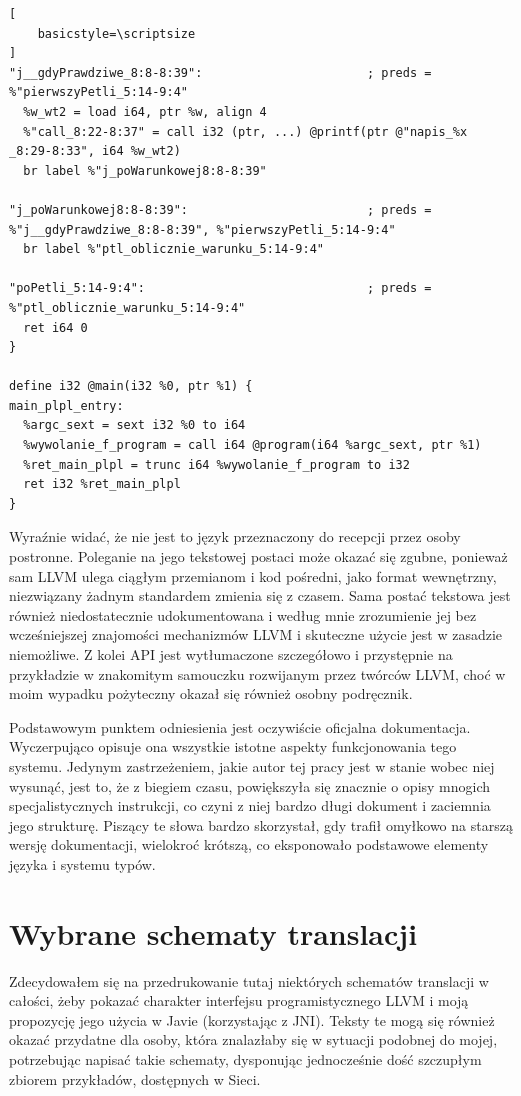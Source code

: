 \begin{lstlisting}[
    basicstyle=\scriptsize
]
"j__gdyPrawdziwe_8:8-8:39":                       ; preds = %"pierwszyPetli_5:14-9:4"
  %w_wt2 = load i64, ptr %w, align 4
  %"call_8:22-8:37" = call i32 (ptr, ...) @printf(ptr @"napis_%x _8:29-8:33", i64 %w_wt2)
  br label %"j_poWarunkowej8:8-8:39"

"j_poWarunkowej8:8-8:39":                         ; preds = %"j__gdyPrawdziwe_8:8-8:39", %"pierwszyPetli_5:14-9:4"
  br label %"ptl_oblicznie_warunku_5:14-9:4"

"poPetli_5:14-9:4":                               ; preds = %"ptl_oblicznie_warunku_5:14-9:4"
  ret i64 0
}

define i32 @main(i32 %0, ptr %1) {
main_plpl_entry:
  %argc_sext = sext i32 %0 to i64
  %wywolanie_f_program = call i64 @program(i64 %argc_sext, ptr %1)
  %ret_main_plpl = trunc i64 %wywolanie_f_program to i32
  ret i32 %ret_main_plpl
}

\end{lstlisting}

Wyraźnie widać, że nie jest to język przeznaczony do recepcji przez osoby postronne. Poleganie na jego tekstowej postaci może okazać się zgubne, ponieważ sam LLVM ulega ciągłym przemianom i kod pośredni, jako format wewnętrzny, niezwiązany żadnym standardem zmienia się z czasem. Sama postać tekstowa jest również niedostatecznie udokumentowana i według mnie zrozumienie jej bez wcześniejszej znajomości mechanizmów LLVM i skuteczne użycie jest w zasadzie niemożliwe. Z kolei API jest wytłumaczone szczegółowo i przystępnie na przykładzie w znakomitym samouczku rozwijanym przez twórców LLVM\cite{kalleidoscope}, choć w moim wypadku pożyteczny okazał się również osobny podręcznik.\cite{llvm_nacke_textbook}

Podstawowym punktem odniesienia  jest oczywiście oficjalna dokumentacja\cite{llvm_lang_ref}. Wyczerpująco opisuje ona wszystkie istotne aspekty funkcjonowania tego systemu. Jedynym zastrzeżeniem, jakie autor tej pracy jest w stanie wobec niej wysunąć, jest to, że z biegiem czasu, powiększyła się znacznie o opisy mnogich specjalistycznych instrukcji, co czyni z niej bardzo długi dokument i zaciemnia jego strukturę. Piszący te słowa bardzo skorzystał, gdy trafił omyłkowo na starszą wersję dokumentacji, wielokroć krótszą, co eksponowało podstawowe elementy języka i systemu typów.

\section{Wybrane schematy translacji}
Zdecydowałem się na przedrukowanie tutaj niektórych schematów translacji w całości, żeby pokazać charakter interfejsu programistycznego LLVM i moją propozycję jego użycia w Javie (korzystając z JNI). Teksty te mogą się również okazać przydatne dla osoby, która znalazłaby się w sytuacji podobnej do mojej, potrzebując napisać takie schematy, dysponując jednocześnie dość szczupłym zbiorem przykładów, dostępnych w Sieci.

